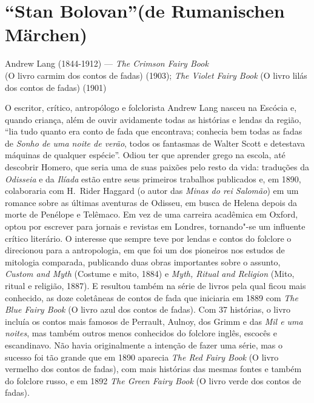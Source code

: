 \section[“Stan Bolovan” (de Rumanischen Märchen)]{\vspace*{-.4em}“Stan Bolovan”\break (de Rumanischen Märchen)}
\enlargethispage{.8em}

{\centering
Andrew Lang (1844-1912) --- \textit{The Crimson Fairy Book}\\ (O livro carmim dos contos de fadas) (1903); 
\textit{The Violet Fairy Book} (O livro lilás dos contos de fadas) (1901)
\par\smallskip}

O escritor, crítico, antropólogo e folclorista Andrew Lang nasceu na
Escócia e, quando criança, além de ouvir avidamente todas as
histórias e lendas da região, “lia tudo quanto era conto de fada que
encontrava; conhecia bem todas as fadas de \textit{Sonho de uma noite de
verão}, todos os fantasmas de Walter Scott e detestava máquinas de
qualquer espécie”. Odiou ter que aprender grego na escola, até
descobrir Homero, que seria uma de suas paixões pelo resto da vida:
traduções da \textit{Odisseia} e da \textit{Ilíada} estão entre seus primeiros
trabalhos publicados e, em 1890, colaboraria com H.~Rider Haggard (o
autor das \textit{Minas do rei Salomão}) em um romance sobre as últimas
aventuras de Odisseu, em busca de Helena depois da morte de Penélope
e Telêmaco. Em vez de uma carreira acadêmica em Oxford, optou por
escrever para \mbox{jornais} e revistas em Londres, tornando"-se um influente
crítico literário. O interesse que sempre teve por lendas e contos do
folclore o direcionou para a antropologia, em que foi um dos
pioneiros nos estudos de mitologia comparada, publicando duas obras
importantes sobre o assunto, \textit{Custom and Myth} (Costume e mito, 1884) e \textit{Myth, Ritual
and Religion} (Mito, ritual e religião, 1887). E resultou também na série de livros pela qual
ficou mais conhecido, as doze coletâneas de contos de fada que
iniciaria em 1889 com \textit{The Blue Fairy Book} (O livro azul dos contos de fadas). 
Com 37 histórias, o livro incluía os contos mais famosos de Perrault, Aulnoy, dos Grimm e das
\textit{Mil e uma noites}, mas também outros menos conhecidos do folclore inglês,
escocês e escandinavo. Não havia originalmente a intenção de fazer
uma série, mas o sucesso foi tão grande que em 1890 aparecia \textit{The Red
Fairy Book} (O livro vermelho dos contos de fadas), com mais histórias das mesmas fontes e também do folclore
russo, e em 1892 \textit{The Green Fairy Book} (O livro verde dos contos de fadas). 
